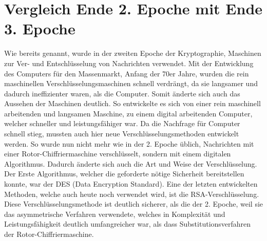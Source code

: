 \section{Vergleich Ende 2. Epoche mit Ende 3. Epoche}
Wie bereits genannt, wurde in der zweiten Epoche der Kryptographie, Maschinen zur Ver- und Entschlüsselung von Nachrichten verwendet. Mit der Entwicklung des Computers für den Massenmarkt, Anfang der 70er Jahre, wurden die rein maschinellen Verschlüsselungsmaschinen schnell verdrängt, da sie langsamer und dadurch ineffizienter waren, als die Computer. Somit änderte sich auch das Aussehen der Maschinen deutlich. So entwickelte es sich von einer rein maschinell arbeitenden und langsamen Maschine, zu einem digital arbeitenden Computer, welcher schneller und leistungsfähiger war. Da die Nachfrage für Computer schnell stieg, mussten auch hier neue Verschlüsselungsmethoden entwickelt werden. So wurde nun nicht mehr wie in der 2. Epoche üblich, Nachrichten mit einer Rotor-Chiffriermaschine verschlüsselt, sondern mit einem digitalen Algorithmus. Dadurch änderte sich auch die Art und Weise der Verschlüsselung. Der Erste Algorithmus, welcher die geforderte nötige Sicherheit bereitstellen konnte, war der DES (Data Encryption Standard). Eine der letzten entwickelten Methoden, welche auch heute noch verwendet wird, ist die RSA-Verschlüsselung. Diese Verschlüsselungsmethode ist deutlich sicherer, als die der 2. Epoche, weil sie das asymmetrische Verfahren verwendete, welches in Komplexität und Leistungsfähigkeit deutlich umfangreicher war, als dass Substitutionsverfahren der Rotor-Chiffriermaschine.

